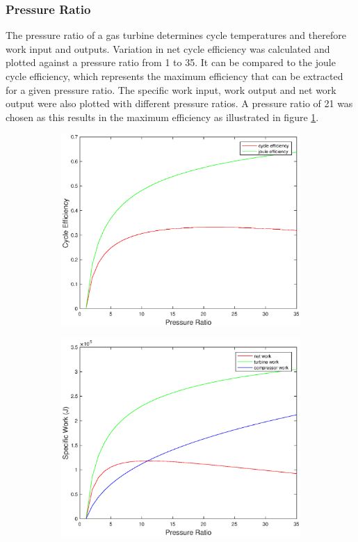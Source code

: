 \subsubsection{Pressure Ratio} 
The pressure ratio of a gas turbine determines cycle temperatures and therefore work input and outputs. Variation in net cycle efficiency was calculated and plotted against a pressure ratio from 1 to 35. It can be compared to the joule cycle efficiency, which represents the maximum efficiency that can be extracted for a given pressure ratio. The specific work input, work output and net work output were also plotted with different pressure ratios. A pressure ratio of 21 was chosen as this results in the maximum efficiency as illustrated in figure \ref{fig:efficiencysimple}.
 \begin{figure} [h]
\centering
\begin{subfigure}{.7\textwidth}
\centering
 \includegraphics[width=0.9\linewidth]{./pictures/efficiency.eps}
  \label{fig:efficiencysimple}
\end{subfigure}
\begin{subfigure}{.7\textwidth}
 \centering
 \includegraphics[width=0.9\linewidth]{./pictures/network.eps}

\end{subfigure}
\end{figure}
